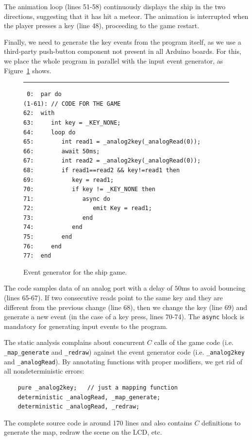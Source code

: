\documentclass{sigplan-proc}
\newcommand{\2}{\;\;}
\newcommand{\5}{\;\;\;\;\;}
\newcommand{\code}[1] {{\small{\texttt{#1}}}}
\begin{document}
The animation loop (lines 51-58) continuously displays the ship in the two 
directions, suggesting that it has hit a meteor.
The animation is interrupted when the player presses a key (line 48), 
proceeding to the game restart.

Finally, we need to generate the key events from the program itself, as we use 
a third-party push-button component not present in all Arduino boards.
For this, we place the whole program in parallel with the input event 
generator, as Figure~\ref{lst:demos:ship:5} shows.

\begin{figure}[t]
\rule{8.5cm}{0.37pt}
{\small
\begin{verbatim}
 0:  par do
(1-61): // CODE FOR THE GAME
62:  with
63:     int key = _KEY_NONE;
64:     loop do
65:        int read1 = _analog2key(_analogRead(0));
66:        await 50ms;
67:        int read2 = _analog2key(_analogRead(0));
68:        if read1==read2 && key!=read1 then
69:           key = read1;
70:           if key != _KEY_NONE then
71:              async do
72:                 emit Key = read1;
73:              end
74:           end
75:        end
76:     end
77:  end
\end{verbatim}
}
\caption{ Event generator for the ship game.
\label{lst:demos:ship:5}
}
\end{figure}

The code samples data of an analog port with a delay of $50$ms to avoid 
bouncing (lines 65-67).
If two consecutive reads point to the same key and they are different from the 
previous change (line 68), then we change the key (line 69) and generate a new 
event (in the case of a key press, lines 70-74).
The \code{async} block is mandatory for generating input events to the program.

The static analysis complains about concurrent $C$ calls of the game code (i.e.  
\code{\_map\_generate} and \code{\_redraw}) against the event generator code 
(i.e. \code{\_analog2key} and \code{\_analogRead}).
By annotating functions with proper modifiers, we get rid of all 
nondeterministic errors:

{\small
\begin{verbatim}
    pure _analog2key;   // just a mapping function
    deterministic _analogRead, _map_generate;
    deterministic _analogRead, _redraw;
\end{verbatim}
}

The complete source code is around 170 lines and also contains $C$ definitions 
to generate the map, redraw the scene on the LCD, etc.
\end{document}
